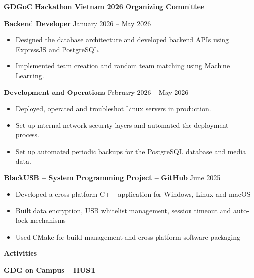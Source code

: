 \documentclass[11pt]{article}
\begin{document}
\vspace{12pt}

\textbf{GDGoC Hackathon Vietnam 2026 Organizing Committee}

\textbf{Backend Developer} \hfill January 2026 -- May 2026
\begin{itemize}[noitemsep, topsep=0pt, partopsep=0pt, parsep=0pt]
    \item Designed the database architecture and developed backend APIs using ExpressJS and PostgreSQL.
    \item Implemented team creation and random team matching using Machine Learning.
\end{itemize}

\vspace{12pt}

\textbf{Development and Operations} \hfill February 2026 -- May 2026
\begin{itemize}[noitemsep, topsep=0pt, partopsep=0pt, parsep=0pt]
    \item Deployed, operated and troubleshot Linux servers in production.
    \item Set up internal network security layers and automated the deployment process.
    \item Set up automated periodic backups for the PostgreSQL database and media data.
\end{itemize}

\vspace{12pt}

\textbf{BlackUSB -- System Programming Project -- \href{https://github.com/ngqtrung2217/BlackUSB}{GitHub}} \hfill June 2025
\begin{itemize}[noitemsep, topsep=0pt, partopsep=0pt, parsep=0pt]
    \item Developed a cross-platform C++ application for Windows, Linux and macOS
    \item Built data encryption, USB whitelist management, session timeout and auto-lock mechanisms
    \item Used CMake for build management and cross-platform software packaging
\end{itemize}

\vspace{12pt}

\begin{center}
    \textbf{Activities}
\end{center}

\textbf{GDG on Campus -- HUST}
\end{document}
